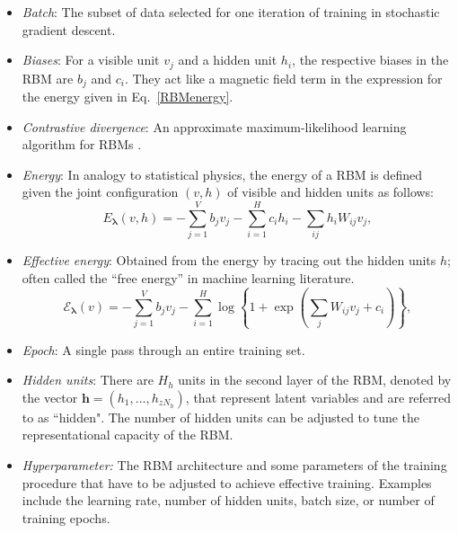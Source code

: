 \documentclass[submission, Phys, hidelinks]{SciPost}
\begin{document}
\begin{itemize}

	\item {\it Batch}: The subset of data selected for one iteration of training in stochastic gradient descent.

	\item {\it Biases}: For a visible unit $v_j$ and a hidden unit $h_i$, the respective biases in the RBM are $b_j$ and $c_i$. They act like a magnetic field term in the expression for the energy given in Eq.~\eqref{RBMenergy}.

	\item {\it Contrastive divergence}: An approximate maximum-likelihood learning algorithm for RBMs \cite{hinton2002training}.

	\item {\it Energy}: In analogy to statistical physics, the energy of a RBM is defined given the joint configuration $(v, h)$ of visible and hidden units as follows:
	   \begin{equation}
		   E_{\bm{\lambda}}(v,h) = - \sum\limits_{j=1}^V b_j v_j - \sum\limits_{i=1}^H c_i h_i - \sum\limits_{ij} h_i W_{ij} v_j, \label{RBMenergy}
	   \end{equation}

	\item {\it Effective energy}: Obtained from the energy by tracing out the hidden units $h$; often called the ``free energy'' in machine learning literature.
	   \begin{equation}
		   \mathcal{E}_{\bm{\lambda}}(v) = - \sum\limits_{j=1}^V b_j v_j - \sum\limits_{i=1}^H \log \left\{ 1 + \exp \left( \sum\limits_{j} W_{ij}v_j +c_i\right) \right\}, \label{RBMeffectiveenergy}
	   \end{equation}

	\item {\it Epoch}: A single pass through an entire training set.

	\item {\it Hidden units}: There are $H_h$ units in the second layer of the RBM, denoted by the vector $\mathbf{h}=(h_1, ..., h_{zN_h})$, that represent latent variables and are referred to as ``hidden". The number of hidden units can be adjusted to tune the representational capacity of the RBM.

	\item{\it Hyperparameter:} The RBM architecture and some parameters of the training procedure that have to be adjusted to achieve effective training. Examples include the learning rate, number of hidden units, batch size, or number of training epochs.


\end{itemize}
\end{document}
